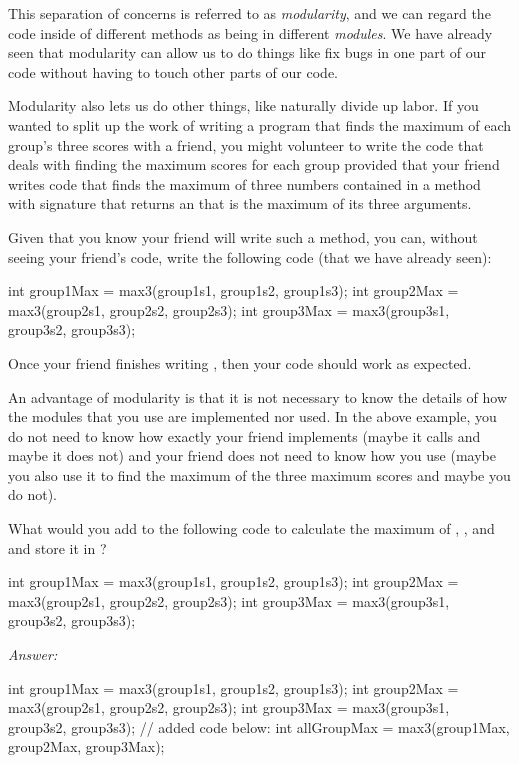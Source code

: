 This separation of concerns is referred to as \emph{modularity},
and we can regard the code inside of different methods as
being in different \emph{modules}.
We have already seen that modularity can allow us to do
things like fix bugs in one part of our code without having
to touch other parts of our code.

Modularity also lets us do other things, like naturally
divide up labor. If you wanted to split up the work
of writing a program that finds the maximum of each
group's three scores with a friend,
you might volunteer to write the code that deals with
finding the maximum scores for each group provided that
your friend writes code that finds the maximum of three numbers
contained in a method with signature  that returns
an  that is the maximum of its three  arguments.

Given that you know your friend will write such a 
method, you can, without seeing your friend's code,
write the following code (that we have already seen):
\begin{code}
int group1Max = max3(group1s1, group1s2, group1s3);
int group2Max = max3(group2s1, group2s2, group2s3);
int group3Max = max3(group3s1, group3s2, group3s3);
\end{code}

\noindent Once your friend finishes writing , then your code
should work as expected. 

An advantage of modularity is that it is not necessary
to know the details of how the modules that you use
are implemented nor used.
In the above example, you do not need to know how exactly your
friend implements  (maybe it calls 
and maybe it does not) and your friend does not need to
know how you use  (maybe you also use it to
find the maximum of the three maximum scores and maybe
you do not).

\begin{example}
What would you add to the following code to calculate
the maximum of , ,
and  and store it in ?

\begin{code}
int group1Max = max3(group1s1, group1s2, group1s3);
int group2Max = max3(group2s1, group2s2, group2s3);
int group3Max = max3(group3s1, group3s2, group3s3);
\end{code}

\noindent \emph{Answer:}
\begin{code}
int group1Max = max3(group1s1, group1s2, group1s3);
int group2Max = max3(group2s1, group2s2, group2s3);
int group3Max = max3(group3s1, group3s2, group3s3);
// added code below:
int allGroupMax = max3(group1Max, group2Max, group3Max);
\end{code}
\end{example}


